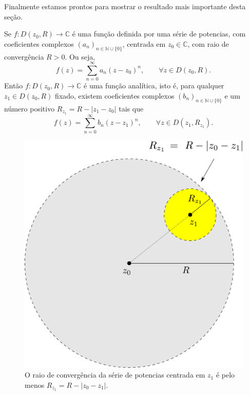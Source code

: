Finalmente estamos prontos para mostrar o resultado mais importante
desta seção.

\bigskip 

\begin{teorema}\label{teo-series-pot-analiticas}
Se $f:D(z_0,R)\to\mathbb{C}$ é uma função definida 
por uma série de potencias, com coeficientes complexos 
$(a_n)_{n\in\mathbb{N}\cup\{0\}}$, centrada
em $z_0\in\mathbb{C}$, com raio de convergência $R>0$. Ou seja,
\[
f(z) = \sum_{n=0}^{\infty} a_n(z-z_0)^n, \qquad \forall z\in D(z_0,R).
\]
Então $f:D(z_0,R)\to\mathbb{C}$ é uma função analítica, isto é, 
para qualquer $z_1\in D(z_0,R)$ fixado, existem 
coeficientes complexos $(b_n)_{n\in\mathbb{N}\cup\{0\}}$ 
e um número positivo $R_{z_1}=R-|z_1-z_0|$
tais que 
\[
f(z) = \sum_{n=0}^{\infty} b_n(z-z_1)^n, \qquad \forall z\in D(z_1,R_{z_1}).
\] 
\end{teorema}

\begin{figure}[h]
\centering
\includegraphics[width=0.55\linewidth]{Figuras/Rz1-func-analitica}
\caption{O raio de convergência da série de potencias centrada em $z_1$ é pelo menos $R_{z_1}=R-|z_0-z_1|$.}
\label{fig:rz1-func-analitica}
\end{figure}


